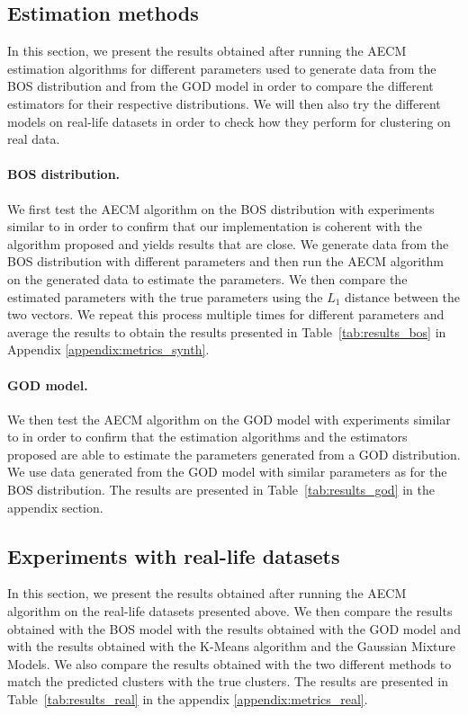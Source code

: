 \subsection{Estimation methods}
In this section, we present the results obtained after running the AECM estimation algorithms for different parameters used to generate data from the BOS distribution and from the GOD model in order to compare the different estimators for their respective distributions. We will then also try the different models on real-life datasets in order to check how they perform for clustering on real data.

\paragraph{BOS distribution.} We first test the AECM algorithm on the BOS distribution with experiments similar to \cite{biernacki2016model} in order to confirm that our implementation is coherent with the algorithm proposed and yields results that are close. We generate data from the BOS distribution with different parameters and then run the AECM algorithm on the generated data to estimate the parameters. We then compare the estimated parameters with the true parameters using the $L_1$ distance between the two vectors. We repeat this process multiple times for different parameters and average the results to obtain the results presented in Table~\ref{tab:results_bos} in Appendix \ref{appendix:metrics_synth}.

\paragraph{GOD model.} We then test the AECM algorithm on the GOD model with experiments similar to \cite{biernacki2016model} in order to confirm that the estimation algorithms and the estimators proposed are able to estimate the parameters generated from a GOD distribution. We use data generated from the GOD model with similar parameters as for the BOS distribution. 
The results are presented in Table~\ref{tab:results_god} in the appendix section.

\subsection{Experiments with real-life datasets}
In this section, we present the results obtained after running the AECM algorithm on the real-life datasets presented above. We then compare the results obtained with the BOS model with the results obtained with the GOD model and with the results obtained with the K-Means algorithm and the Gaussian Mixture Models. We also compare the results obtained with the two different methods to match the predicted clusters with the true clusters. The results are presented in Table~\ref{tab:results_real} in the appendix \ref{appendix:metrics_real}.


